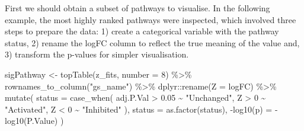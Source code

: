 \documentclass[9pt,a4paper,]{extarticle}
\newenvironment{Shaded}{\begin{snugshade}}{\end{snugshade}}
\newcommand{\AttributeTok}[1]{\textcolor[rgb]{0.77,0.63,0.00}{#1}}
\newcommand{\DecValTok}[1]{\textcolor[rgb]{0.00,0.00,0.81}{#1}}
\newcommand{\FloatTok}[1]{\textcolor[rgb]{0.00,0.00,0.81}{#1}}
\newcommand{\FunctionTok}[1]{\textcolor[rgb]{0.00,0.00,0.00}{#1}}
\newcommand{\NormalTok}[1]{#1}
\newcommand{\OtherTok}[1]{\textcolor[rgb]{0.56,0.35,0.01}{#1}}
\newcommand{\SpecialCharTok}[1]{\textcolor[rgb]{0.00,0.00,0.00}{#1}}
\newcommand{\StringTok}[1]{\textcolor[rgb]{0.31,0.60,0.02}{#1}}
\begin{document}
First we should obtain a subset of pathways to visualise.
In the following example, the most highly ranked pathways were inspected, which involved three steps to prepare the data: 1) create a categorical variable with the pathway status, 2) rename the logFC column to reflect the true meaning of the value and, 3) transform the p-values for simpler visualisation.

\begin{Shaded}
\begin{Highlighting}[]
\NormalTok{sigPathway }\OtherTok{\textless{}{-}} \FunctionTok{topTable}\NormalTok{(z\_fits, }\AttributeTok{number =} \DecValTok{8}\NormalTok{) }\SpecialCharTok{\%\textgreater{}\%} 
  \FunctionTok{rownames\_to\_column}\NormalTok{(}\StringTok{"gs\_name"}\NormalTok{) }\SpecialCharTok{\%\textgreater{}\%} 
\NormalTok{  dplyr}\SpecialCharTok{::}\FunctionTok{rename}\NormalTok{(}\AttributeTok{Z =}\NormalTok{ logFC) }\SpecialCharTok{\%\textgreater{}\%} 
  \FunctionTok{mutate}\NormalTok{(}
    \AttributeTok{status =} \FunctionTok{case\_when}\NormalTok{(}
\NormalTok{      adj.P.Val }\SpecialCharTok{\textgreater{}} \FloatTok{0.05} \SpecialCharTok{\textasciitilde{}} \StringTok{"Unchanged"}\NormalTok{,}
\NormalTok{      Z }\SpecialCharTok{\textgreater{}} \DecValTok{0} \SpecialCharTok{\textasciitilde{}} \StringTok{"Activated"}\NormalTok{, }
\NormalTok{      Z }\SpecialCharTok{\textless{}} \DecValTok{0} \SpecialCharTok{\textasciitilde{}} \StringTok{"Inhibited"}
\NormalTok{    ),}
    \AttributeTok{status =} \FunctionTok{as.factor}\NormalTok{(status),}
    \StringTok{\textasciigrave{}}\AttributeTok{{-}log10(p)}\StringTok{\textasciigrave{}} \OtherTok{=} \SpecialCharTok{{-}}\FunctionTok{log10}\NormalTok{(P.Value)}
\NormalTok{  )}
\end{Highlighting}
\end{Shaded}
\end{document}
